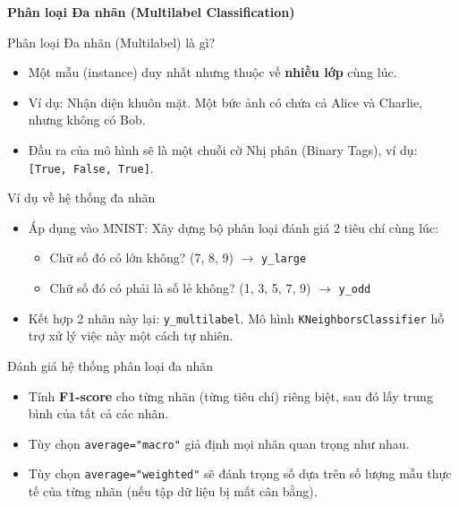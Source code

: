 \documentclass[aspectratio=169]{beamer}
\begin{document}
\begin{frame}
\vfill\centering\LARGE\textbf{Phân loại Đa nhãn (Multilabel Classification)}\vfill
\end{frame}

\begin{frame}{Phân loại Đa nhãn (Multilabel) là gì?}
\begin{itemize}
    \item Một mẫu (instance) duy nhất nhưng thuộc về \textbf{nhiều lớp} cùng lúc.
    \item Ví dụ: Nhận diện khuôn mặt. Một bức ảnh có chứa cả Alice và Charlie, nhưng không có Bob.
    \item Đầu ra của mô hình sẽ là một chuỗi cờ Nhị phân (Binary Tags), ví dụ: \texttt{[True, False, True]}.
\end{itemize}
\end{frame}

\begin{frame}{Ví dụ về hệ thống đa nhãn}
\begin{itemize}
    \item Áp dụng vào MNIST: Xây dựng bộ phân loại đánh giá 2 tiêu chí cùng lúc:
    \begin{itemize}
        \item Chữ số đó có lớn không? (7, 8, 9) $\rightarrow$ \texttt{y\_large}
        \item Chữ số đó có phải là số lẻ không? (1, 3, 5, 7, 9) $\rightarrow$ \texttt{y\_odd}
    \end{itemize}
    \item Kết hợp 2 nhãn này lại: \texttt{y\_multilabel}. Mô hình \texttt{KNeighborsClassifier} hỗ trợ xử lý việc này một cách tự nhiên.
\end{itemize}
\end{frame}

\begin{frame}{Đánh giá hệ thống phân loại đa nhãn}
\begin{itemize}
    \item Tính \textbf{F1-score} cho từng nhãn (từng tiêu chí) riêng biệt, sau đó lấy trung bình của tất cả các nhãn.
    \item Tùy chọn \texttt{average="macro"} giả định mọi nhãn quan trọng như nhau.
    \item Tùy chọn \texttt{average="weighted"} sẽ đánh trọng số dựa trên số lượng mẫu thực tế của từng nhãn (nếu tập dữ liệu bị mất cân bằng).
\end{itemize}
\end{frame}
\end{document}
